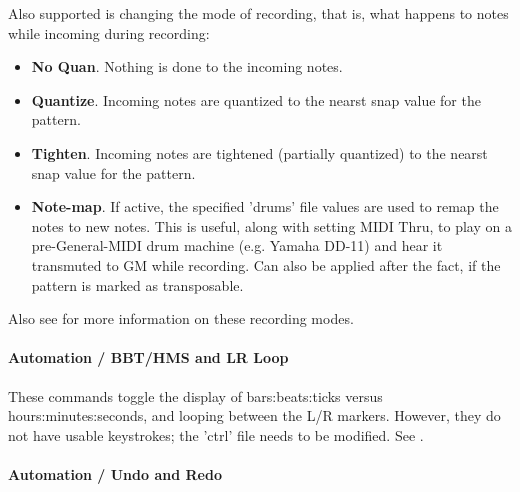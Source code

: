    Also supported is changing the mode of recording, that is, what happens
   to notes while incoming during recording:

   \begin{itemize}
      \item \textbf{No Quan}.
         Nothing is done to the incoming notes.
      \item \textbf{Quantize}.
         Incoming notes are quantized to the nearst snap value for the
         pattern.
      \item \textbf{Tighten}.
         Incoming notes are tightened (partially quantized)
         to the nearst snap value for the pattern.
      \item \textbf{Note-map}.
         If active, the specified 'drums' file values are used to remap the
         notes to new notes. This is useful, along with setting MIDI Thru, to
         play on a pre-General-MIDI drum machine (e.g. Yamaha DD-11) and
         hear it transmuted to GM while recording. Can also be applied after
         the fact, if the pattern is marked as transposable.
      \end{itemize}

   Also see  for more information on
   these recording modes.

\paragraph{Automation / BBT/HMS and LR Loop}
\label{paragraph:configuration_bbthms_lr_loop}

   These commands toggle the display of bars:beats:ticks versus
   hours:minutes:seconds, and looping between the L/R markers.
   However, they do not have usable keystrokes; the 'ctrl' file
   needs to be modified.
   See .

\paragraph{Automation / Undo and Redo}
\label{paragraph:configuration_undo_redo}

